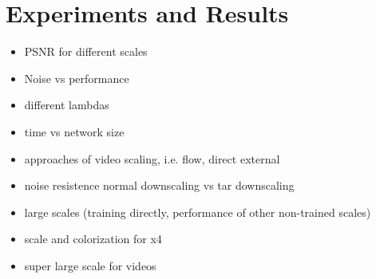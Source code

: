 \newpage
\section{Experiments and Results}
\label{sec:ExperimentsandResults}



\begin{itemize}
  \item PSNR for different scales
  \item Noise vs performance
  \item different lambdas
  \item time vs network size
  \item approaches of video scaling, i.e. flow, direct external
  \item noise resistence normal downscaling vs tar downscaling
  \item large scales (training directly, performance of other non-trained scales)
  \item scale and colorization for x4
  \item super large scale for videos
\end{itemize}


